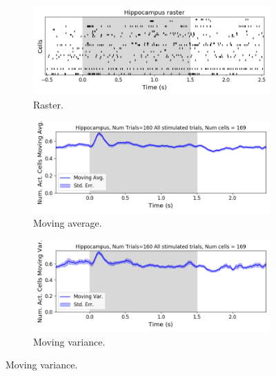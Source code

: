     \begin{figure}[p]
      \begin{subfigure}[h]{\linewidth}
        \includegraphics[width=\linewidth]{figures/conway_maxwell/hippocampus_raster_16.png}
        \caption{Raster.}
        \label{fig:hippocampus_raster}
      \end{subfigure}
      \begin{subfigure}[h]{\linewidth}
        \includegraphics[width=\linewidth]{figures/conway_maxwell/hippocampus_1ms_moving_avg_all_stimulated_trials.png}
        \caption{Moving average.}
        \label{fig:hippocampus_moving_avg_num_active_cells}
      \end{subfigure}
      \begin{subfigure}[h]{\linewidth}
        \includegraphics[width=\linewidth]{figures/conway_maxwell/hippocampus_1ms_moving_var_all_stimulated_trials.png}
        \caption{Moving variance.}
        \label{fig:hippocampus_moving_var_num_active_cells}
      \end{subfigure}

\end{figure}
